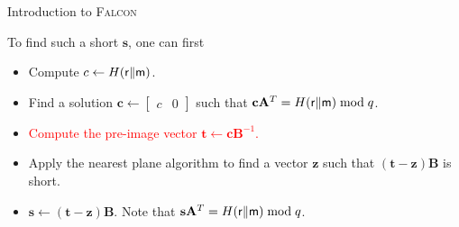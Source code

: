 \begin{frame}{Introduction to \textsc{Falcon}}

To find such a short $\mathbf{s}$, one can first
\pause
\begin{itemize}
    \item Compute $c \gets H({\sf r} \| {\sf m})$.
    \pause
    \item Find a solution $\mathbf{c} \gets \left[
		\begin{array}{c|c} c & 0 \end{array}
		\right]$ such that $\mathbf{c}\mathbf{A}^T = H({\sf r} \| {\sf m}) \bmod q$.
    \pause
    \item \textcolor<7->{red}{Compute the pre-image vector $\mathbf{t} \gets \mathbf{c}\mathbf{B}^{-1}$.}
    \pause
    \item Apply the nearest plane algorithm to find a vector $\mathbf{z}$ such that $\mathbf{(t-z)B}$ is short.
    \pause
    \item $\mathbf{s} \gets \mathbf{(t-z)B}$. Note that $\mathbf{s}\mathbf{A}^T = H({\sf r} \| {\sf m}) \bmod q$.
\end{itemize}
\end{frame}





